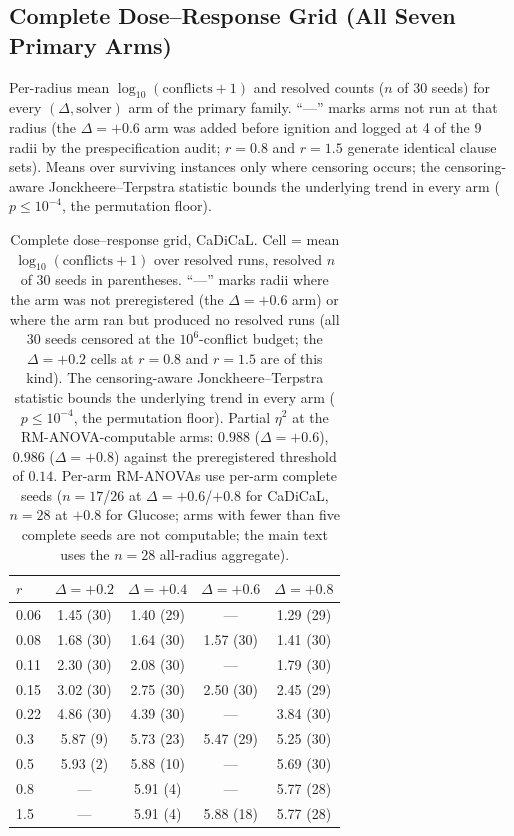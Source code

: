 \documentclass[pdflatex,sn-basic,Numbered]{sn-jnl}
\begin{document}
\begin{appendices}
\section{Complete Dose--Response Grid (All Seven Primary Arms)}
\label{app:e3atable}

Per-radius mean $\log_{10}(\text{conflicts}+1)$ and resolved counts
($n$ of 30 seeds) for every $(\Delta, \text{solver})$ arm of the primary
family. ``---'' marks arms not run at that radius (the $\Delta{=}{+}0.6$ arm
was added before ignition and logged at 4 of the 9 radii by the
prespecification audit; $r{=}0.8$ and $r{=}1.5$ generate
identical clause sets). Means over surviving instances only where censoring
occurs; the censoring-aware Jonckheere--Terpstra statistic bounds the
underlying trend in every arm ($p\le10^{-4}$, the permutation floor).

\begin{table}[h]
\centering
\caption{Complete dose--response grid, CaDiCaL. Cell = mean
$\log_{10}(\text{conflicts}+1)$ over resolved runs, resolved $n$ of 30 seeds
in parentheses. ``---'' marks radii where the arm was not preregistered
(the $\Delta{=}{+}0.6$ arm) or where the arm ran but produced no resolved
runs (all 30 seeds censored at the $10^6$-conflict budget; the
$\Delta{=}{+}0.2$ cells at $r{=}0.8$ and $r{=}1.5$ are of this kind). The
censoring-aware Jonckheere--Terpstra statistic bounds the underlying trend in
every arm ($p\le10^{-4}$, the permutation floor). Partial $\eta^2$ at the
RM-ANOVA-computable arms: $0.988$ ($\Delta{=}{+}0.6$), $0.986$
($\Delta{=}{+}0.8$) against the preregistered threshold of $0.14$. Per-arm
RM-ANOVAs use per-arm complete seeds ($n{=}17$/$26$ at $\Delta{=}{+}0.6$/$
+0.8$ for CaDiCaL, $n{=}28$ at $+0.8$ for Glucose; arms with fewer than five
complete seeds are not computable; the main text uses the $n{=}28$
all-radius aggregate).}
\label{tab:e3afull}
\begin{tabular}{lcccc}
\toprule
$r$ & $\Delta{=}{+}0.2$ & $\Delta{=}{+}0.4$ & $\Delta{=}{+}0.6$ & $\Delta{=}{+}0.8$\\
\midrule
0.06 & 1.45 (30) & 1.40 (29) & --- & 1.29 (29)\\
0.08 & 1.68 (30) & 1.64 (30) & 1.57 (30) & 1.41 (30)\\
0.11 & 2.30 (30) & 2.08 (30) & --- & 1.79 (30)\\
0.15 & 3.02 (30) & 2.75 (30) & 2.50 (30) & 2.45 (29)\\
0.22 & 4.86 (30) & 4.39 (30) & --- & 3.84 (30)\\
0.3 & 5.87 (9) & 5.73 (23) & 5.47 (29) & 5.25 (30)\\
0.5 & 5.93 (2) & 5.88 (10) & --- & 5.69 (30)\\
0.8 & --- & 5.91 (4) & --- & 5.77 (28)\\
1.5 & --- & 5.91 (4) & 5.88 (18) & 5.77 (28)\\
\bottomrule
\end{tabular}
\end{table}


\end{appendices}
\end{document}
